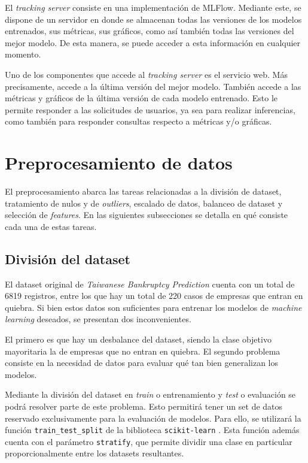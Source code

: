 El \textit{tracking server} consiste en una implementación de MLFlow. Mediante este, se dispone de un servidor en donde se almacenan todas las versiones de los modelos entrenados, sus métricas, sus gráficos, como así también todas las versiones del mejor modelo. De esta manera, se puede acceder a esta información en cualquier momento.

Uno de los componentes que accede al \textit{tracking server} es el servicio web. Más precisamente, accede a la última versión del mejor modelo. También accede a las métricas y gráficos de la última versión de cada modelo entrenado. Esto le permite responder a las solicitudes de usuarios, ya sea para realizar inferencias, como también para responder consultas respecto a métricas y/o gráficas.

\section{Preprocesamiento de datos}
\label{sec:preprocesamiento_de_datos}

El preprocesamiento abarca las tareas relacionadas a la división de dataset, tratamiento de nulos y de \textit{outliers}, escalado de datos, balanceo de dataset y selección de \textit{features}. En las siguientes subsecciones se detalla en qué consiste cada una de estas tareas.

\subsection{División del dataset}
\label{subsec:division_dataset}

El dataset original de \textit{Taiwanese Bankruptcy Prediction} \citep{taiwanese_bankruptcy_prediction_572} cuenta con un total de 6819 registros, entre los que hay un total de 220 casos de empresas que entran en quiebra. Si bien estos datos son suficientes para entrenar los modelos de \textit{machine learning} deseados, se presentan dos inconvenientes.

El primero es que hay un desbalance del dataset, siendo la clase objetivo mayoritaria la de empresas que no entran en quiebra. El segundo problema consiste en la necesidad de datos para evaluar qué tan bien generalizan los modelos.

Mediante la división del dataset en \textit{train} o entrenamiento y \textit{test} o evaluación se podrá resolver parte de este problema. Esto permitirá tener un set de datos reservado exclusivamente para la evaluación de modelos. Para ello, se utilizará la función \texttt{train\_test\_split} \citep{WEBSITE:train_test_split} de la biblioteca \texttt{scikit-learn} \citep{WEBSITE:scikit-learn}. Esta función además cuenta con el parámetro \texttt{stratify}, que permite dividir una clase en particular proporcionalmente entre los datasets resultantes.

